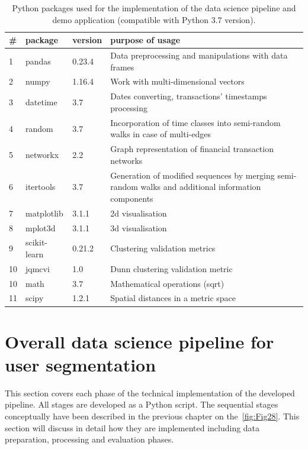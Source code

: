 \begin{table}
\begin{center}
\begin{tabular}{ | m{0.7em} | m{1.7cm} | m{1.5cm} | m{11cm} |} 
\hline
\textbf{\#} & \textbf{package} & \textbf{version} & \textbf{purpose of usage} \\ 
\hline
1 & pandas & 0.23.4 & Data preprocessing and manipulations with data frames \\
\hline
2 & numpy & 1.16.4 & Work with multi-dimensional vectors \\
\hline
3 & datetime & 3.7 & Dates converting, transactions' timestamps processing \\
\hline
4 & random & 3.7 & Incorporation of time classes into semi-random walks in case of multi-edges \\ 
\hline
5 & networkx & 2.2 & Graph representation of financial transaction networks \\
\hline
6 & itertools & 3.7 & Generation of modified sequences by merging semi-random walks and additional information components \\
\hline
7 & matplotlib & 3.1.1 & 2d visualisation \\
\hline
8 & mplot3d & 3.1.1 & 3d visualisation \\
\hline
9 & scikit-learn & 0.21.2 & Clustering validation metrics  \\
\hline
10 & jqmcvi & 1.0 & Dunn clustering validation metric  \\
\hline
10 & math & 3.7 & Mathematical operations (sqrt) \\
\hline
11 & scipy & 1.2.1 & Spatial distances in a metric space \\
\hline
\end{tabular}
\caption {Python packages used for the implementation of the data science pipeline and demo application (compatible with Python 3.7 version).}
\label{tab:tab3}
\end{center}
\end {table}

\section{Overall data science pipeline for user segmentation}
\label{Overall data science pipeline for user segmentation}
This section covers each phase of the technical implementation of the developed pipeline. All stages are developed as a Python script. The sequential stages conceptually have been described in the previous chapter on the~\autoref{fig:Fig28}. This section will discuss in detail how they are implemented including data preparation, processing and evaluation phases.

